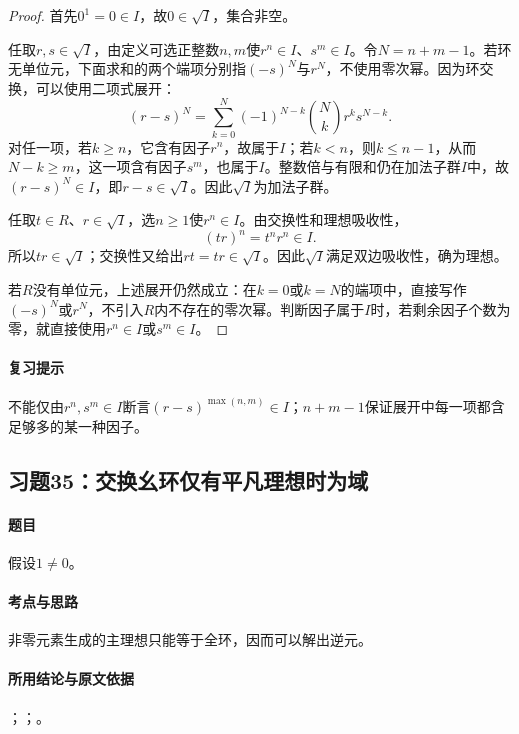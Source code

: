 
\begin{proof}
首先$0^1=0\in I$，故$0\in\sqrt I$，集合非空。

任取$r,s\in\sqrt I$，由定义可选正整数$n,m$使$r^n\in I$、$s^m\in I$。令$N=n+m-1$。若环无单位元，下面求和的两个端项分别指$(-s)^N$与$r^N$，不使用零次幂。因为环交换，可以使用二项式展开：
\[
(r-s)^N=\sum_{k=0}^{N}(-1)^{N-k}\binom Nk r^k s^{N-k}.
\]
对任一项，若$k\geq n$，它含有因子$r^n$，故属于$I$；若$k<n$，则$k\leq n-1$，从而$N-k\geq m$，这一项含有因子$s^m$，也属于$I$。整数倍与有限和仍在加法子群$I$中，故$(r-s)^N\in I$，即$r-s\in\sqrt I$。因此$\sqrt I$为加法子群。

任取$t\in R$、$r\in\sqrt I$，选$n\geq1$使$r^n\in I$。由交换性和理想吸收性，
\[
(tr)^n=t^nr^n\in I.
\]
所以$tr\in\sqrt I$；交换性又给出$rt=tr\in\sqrt I$。因此$\sqrt I$满足双边吸收性，确为理想。

若$R$没有单位元，上述展开仍然成立：在$k=0$或$k=N$的端项中，直接写作$(-s)^N$或$r^N$，不引入$R$内不存在的零次幂。判断因子属于$I$时，若剩余因子个数为零，就直接使用$r^n\in I$或$s^m\in I$。
\end{proof}

\paragraph{复习提示}
不能仅由$r^n,s^m\in I$断言$(r-s)^{\max(n,m)}\in I$；$n+m-1$保证展开中每一项都含足够多的某一种因子。


\subsection{习题35：\texorpdfstring{交换幺环仅有平凡理想时为域}{交换幺环仅有平凡理想时为域}}
\label{ex:1:35}

\paragraph{题目}
假设$1\neq0$。

\paragraph{考点与思路}
非零元素生成的主理想只能等于全环，因而可以解出逆元。

\paragraph{所用结论与原文依据}
；；。

